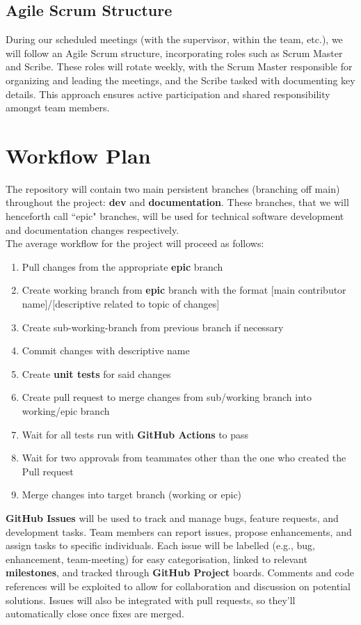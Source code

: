 \documentclass{article}
\begin{document}
\subsection*{Agile Scrum Structure}
During our scheduled meetings (with the supervisor, within the team, etc.), we will follow an Agile Scrum structure, incorporating roles such as Scrum Master and Scribe. These roles will rotate weekly, with the Scrum Master responsible for organizing  and leading the meetings, and the Scribe tasked with documenting key details. This approach ensures active participation and shared responsibility amongst team members.

\section{Workflow Plan}

\hspace{\parindent}The repository will contain two main persistent branches (branching off main) throughout the project:
\textbf{dev} and \textbf{documentation}. These branches, that we will henceforth call ``epic" branches, will be used for technical
software development and documentation changes respectively. \\

The average workflow for the project will proceed as follows:
\begin{enumerate}
  \item Pull changes from the appropriate \textbf{epic} branch
  \item Create working branch from \textbf{epic} branch with the
    format [main contributor name]/[descriptive related to topic of changes]
  \item Create sub-working-branch from previous branch if necessary
  \item Commit changes with descriptive name
  \item Create \textbf{unit tests} for said changes
  \item Create pull request to merge changes from sub/working branch
    into working/epic branch
  \item Wait for all tests run with \textbf{GitHub Actions} to pass
  \item Wait for two approvals from teammates other than the one who
    created the Pull request
  \item Merge changes into target branch (working or epic)
\end{enumerate}

\noindent
\hspace{\parindent}\textbf{GitHub Issues} will be used to track and
manage bugs, feature requests, and development tasks. Team members
can report issues, propose enhancements, and assign tasks to specific
individuals. Each issue will be labelled (e.g., bug, enhancement,
team-meeting) for easy categorisation, linked to relevant
\textbf{milestones}, and tracked through \textbf{GitHub Project}
boards. Comments and code references will be exploited to allow for
collaboration and discussion on potential solutions. Issues will also
be integrated with pull requests, so they’ll automatically close once
fixes are merged. \\
\end{document}
